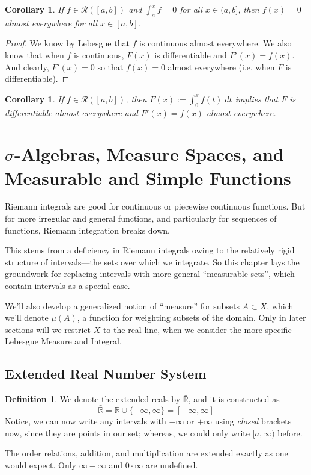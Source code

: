 \documentclass[12pt]{article}
\theoremstyle{plain}
\newtheorem{cor}[thm]{Corollary}
\theoremstyle{definition}
\newtheorem{defn}[thm]{Definition}
\theoremstyle{remark}
\begin{document}
\begin{cor}
If $f\in\mathscr{R}([a,b])$ and $\int^x_a f = 0$ for all $x\in(a,b]$, then $f(x)=0$ almost everywhere for all $x\in[a,b]$.
\end{cor}
\begin{proof}
We know by Lebesgue that $f$ is continuous almost everywhere. We also know that when $f$ is continuous, $F(x)$ is differentiable and $F'(x)=f(x)$. And clearly, $F'(x)=0$ so that $f(x)=0$ almost everywhere (i.e. when $F$ is differentiable).
\end{proof}

\begin{cor}
If $f\in\mathscr{R}([a,b])$, then $F(x):=\int^x_0 f(t) \; dt$ implies that $F$ is differentiable almost everywhere and $F'(x)=f(x)$ almost everywhere.
\end{cor}

\newpage
\section{$\sigma$-Algebras, Measure Spaces, and Measurable and Simple Functions}

Riemann integrals are good for continuous or piecewise continuous
functions.  But for more irregular and general functions, and
particularly for sequences of functions, Riemann integration breaks
down.

This stems from a deficiency in Riemann integrals owing to the
relatively rigid structure of intervals---the sets over which we
integrate. So this chapter lays the groundwork for replacing intervals
with more general ``measurable sets'', which contain intervals as a
special case.

We'll also develop a generalized notion of ``measure'' for subsets
$A\subset X$, which we'll denote $\mu(A)$, a function for weighting
subsets of the domain. Only in later sections will we restrict $X$ to
the real line, when we consider the more specific Lebesgue Measure and
Integral.



\subsection{Extended Real Number System}

\begin{defn}
We denote the extended reals by $\bar{\mathbb{R}}$, and it is constructed as 
\[ 
    \bar{\mathbb{R}} = {\mathbb{R}} \cup \{-\infty, \infty\}
    = [-\infty,\infty]
\]
Notice, we can now write any intervals with $-\infty$ or $+\infty$ using \emph{closed} brackets now, since they are points in our set; whereas, we could only write $[a,\infty)$ before.

The order relations, addition, and multiplication are extended exactly as one would expect. Only $\infty-\infty$ and $0\cdot \infty$ are undefined.
\end{defn}
\end{document}
